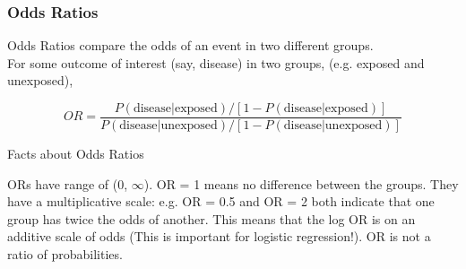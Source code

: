 \documentclass[table]{beamer}\usepackage[]{graphicx}\usepackage[]{color}
\begin{document}
\begin{frame}
\frametitle{Odds Ratios}

\vspace{-2mm}

Odds Ratios compare the odds of an event in two different groups.\\



For some outcome of interest (say, disease) in two groups, (e.g. exposed and unexposed),



\[OR = \frac{P(\text{disease} | \text{exposed}) / [1-P(\text{disease} | \text{exposed})]}{P(\text{disease} | \text{unexposed})/[1-P(\text{disease} | \text{unexposed})]} \]

\begin{block}{Facts about Odds Ratios}
\begin{itemize}
  \myitem ORs have range of (0, $\infty$). 
  \myitem OR = 1 means no difference between the groups.
  \myitem They have a multiplicative scale: e.g. OR = 0.5 and OR = 2 both indicate that one group has twice the odds of another.
  \myitem This means that the log OR is on an additive scale of odds (This is important for logistic regression!).
  \myitem OR is not a ratio of probabilities.
\end{itemize}  
\end{block}

\end{frame}


\end{document}
